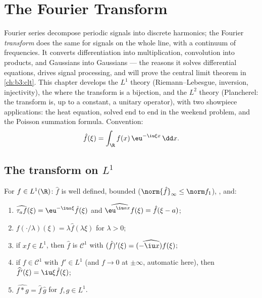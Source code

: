 \chapter{The Fourier Transform}\label{ch:b3:fouriertransform}

Fourier series decompose periodic signals into discrete
harmonics; the Fourier \emph{transform} does the same for
signals on the whole line, with a continuum of frequencies. It
converts differentiation into multiplication, convolution into
products, and Gaussians into Gaussians --- the reasons it
solves differential equations, drives signal processing, and
will prove the central limit theorem in \cref{ch:b3:clt}. This
chapter develops the $L^1$ theory (Riemann--Lebesgue,
inversion, injectivity), the  where the
transform is a  bijection, and the $L^2$ theory
(Plancherel: the transform is, up to a constant, a unitary
operator), with two showpiece applications: the heat equation,
solved end to end in the weekend problem, and the Poisson
summation formula. Convention:
\[
\hat f(\xi) = \int_\R f(x)\,\eu^{-\iu\xi x}\,\dd x .
\]

\section{The transform on \texorpdfstring{$L^1$}{L1}}

\begin{proposition}\label{prop:b3:fouriertransform:basic}
For $f \in L^1(\R)$: $\hat f$ is well defined, bounded
($\norm{\hat f}_\infty \leq \norm f_1$), , and:
\begin{enumerate}
  \item $\widehat{\tau_af}(\xi) = \eu^{-\iu a\xi}\hat f(\xi)$
        and $\widehat{\eu^{\iu ax}f}(\xi) = \hat f(\xi - a)$;
  \item $\widehat{f(\cdot/\lambda)}(\xi) = \lambda\hat
        f(\lambda\xi)$ for $\lambda > 0$;
  \item if $xf \in L^1$, then $\hat f$ is $\mathcal C^1$ with
        $(\hat f)'(\xi) = \widehat{(-\iu x)f}(\xi)$;
  \item if $f \in \mathcal C^1$ with $f' \in L^1$ (and $f \to
        0$ at $\pm\infty$, automatic here), then
        $\widehat{f'}(\xi) = \iu\xi\hat f(\xi)$;
  \item $\widehat{f * g} = \hat f\,\hat g$ for $f, g \in L^1$.
\end{enumerate}
\end{proposition}

